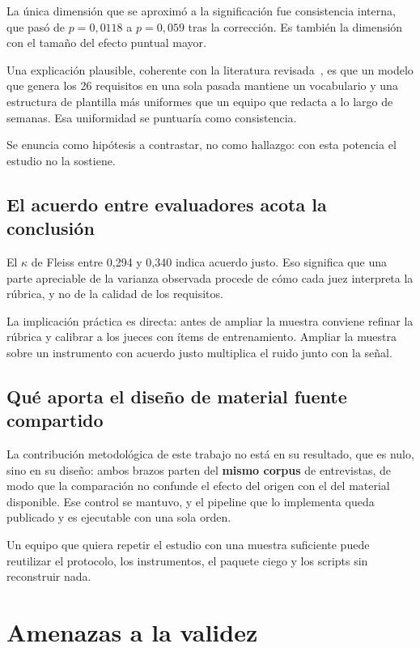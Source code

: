 \documentclass[11pt,a4paper]{article}
\begin{document}
La \'unica dimensi\'on que se aproxim\'o a la significaci\'on fue consistencia interna,
que pas\'o de $p = 0{,}0118$ a $p = 0{,}059$ tras la correcci\'on. Es tambi\'en la
dimensi\'on con el tama\~no del efecto puntual mayor.

Una explicaci\'on plausible, coherente con la literatura
revisada~\cite{ronanki2023investigating,gorer2023generating}, es que un modelo que
genera los 26 requisitos en una sola pasada mantiene un vocabulario y una estructura de
plantilla m\'as uniformes que un equipo que redacta a lo largo de semanas. Esa
uniformidad se puntuar\'ia como consistencia.

Se enuncia como hip\'otesis a contrastar, no como hallazgo: con esta potencia el estudio
no la sostiene.

\subsection{El acuerdo entre evaluadores acota la conclusi\'on}

El $\kappa$ de Fleiss entre 0,294 y 0,340 indica acuerdo justo. Eso significa que una
parte apreciable de la varianza observada procede de c\'omo cada juez interpreta la
r\'ubrica, y no de la calidad de los requisitos.

La implicaci\'on pr\'actica es directa: antes de ampliar la muestra conviene refinar la
r\'ubrica y calibrar a los jueces con \'items de entrenamiento. Ampliar la muestra sobre
un instrumento con acuerdo justo multiplica el ruido junto con la se\~nal.

\subsection{Qu\'e aporta el dise\~no de material fuente compartido}

La contribuci\'on metodol\'ogica de este trabajo no est\'a en su resultado, que es nulo,
sino en su dise\~no: ambos brazos parten del \textbf{mismo corpus} de entrevistas, de
modo que la comparaci\'on no confunde el efecto del origen con el del material
disponible. Ese control se mantuvo, y el pipeline que lo implementa queda publicado y es
ejecutable con una sola orden.

Un equipo que quiera repetir el estudio con una muestra suficiente puede reutilizar el
protocolo, los instrumentos, el paquete ciego y los scripts sin reconstruir nada.

\section{Amenazas a la validez}
\label{sec:amenazas}
\end{document}
